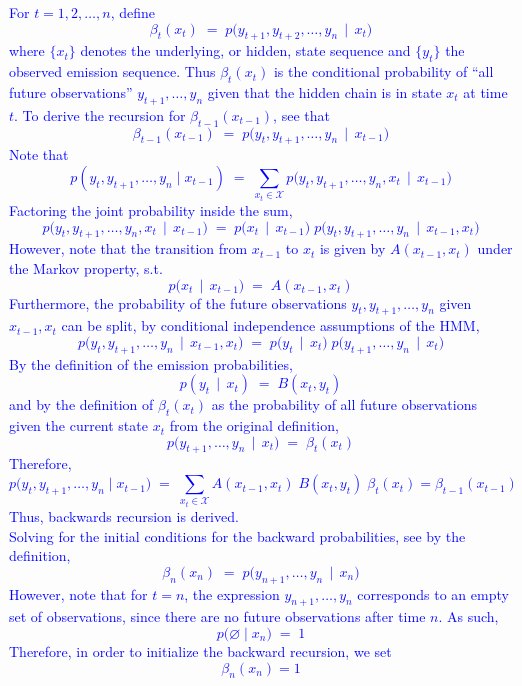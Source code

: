\documentclass{article}
\begin{document}
\textcolor{blue}{
For $t = 1, 2, \ldots, n$, define
\[
\beta_t(x_t) 
\;=\; 
p\bigl(y_{t+1}, y_{t+2}, \dots, y_n \,\mid\, x_t\bigr)
\]
where $\{x_t\}$ denotes the underlying, or hidden, state sequence and $\{y_t\}$ the observed emission sequence. 
Thus $\beta_t(x_t)$ is the conditional probability of ``all future observations'' $y_{t+1},\dots,y_n$ given that the hidden chain is in state $x_t$ at time $t$.
\noindent
To derive the recursion for $\beta_{t-1}(x_{t-1})$, see that
\[
\beta_{t-1}(x_{t-1}) 
\;=\; 
p\bigl(y_t, y_{t+1}, \dots, y_n \,\mid\, x_{t-1}\bigr)
\]
Note that
\[
p(y_t, y_{t+1}, \dots, y_n \mid x_{t-1})
\;=\;
\sum_{x_t \in \mathcal{X}}
p\bigl(y_t, y_{t+1}, \dots, y_n, x_t \,\mid\, x_{t-1}\bigr)
\]
Factoring the joint probability inside the sum,
\[
p\bigl(y_t, y_{t+1}, \dots, y_n, x_t \,\mid\, x_{t-1}\bigr)
\;=\;
p\bigl(x_t \,\mid\, x_{t-1}\bigr)\; p\bigl(y_t, y_{t+1}, \dots, y_n \,\mid\, x_{t-1}, x_t\bigr)
\]
However, note that the transition from $x_{t-1}$ to $x_t$ is given by $A(x_{t-1}, x_t)$ under the Markov property, s.t.
\[
p\bigl(x_t \,\mid\, x_{t-1}\bigr)
\;=\;
A(x_{t-1}, x_t)
\]
Furthermore, the probability of the future observations $y_t, y_{t+1}, \dots, y_n$ given $x_{t-1}, x_t$ can be split, by conditional independence assumptions of the HMM, 
\[
p\bigl(y_t, y_{t+1}, \dots, y_n \,\mid\, x_{t-1}, x_t \bigr)
\;=\;
p\bigl(y_t \,\mid\, x_t \bigr)\;p\bigl(y_{t+1}, \dots, y_n \,\mid\, x_t \bigr)
\]
By the definition of the emission probabilities,
\[
p(y_t \,\mid\, x_t)
\;=\;
B(x_t, y_t)
\]
and by the definition of $\beta_t(x_t)$ as the probability of all future observations given the current state $x_t$ from the original definition,
\[
p\bigl(y_{t+1}, \dots, y_n \,\mid\, x_t \bigr)
\;=\;
\beta_t(x_t)
\]
Therefore,
\[
p\bigl(y_t, y_{t+1}, \dots, y_n \mid x_{t-1}\bigr)
\;=\;
\sum_{x_t \in \mathcal{X}} 
A(x_{t-1}, x_t)\;
B(x_t, y_t)\;
\beta_t(x_t) = \beta_{t-1}(x_{t-1})
\]
Thus, backwards recursion is derived. \\ 
\noindent
Solving for the initial conditions for the backward probabilities, 
see by the definition, 
\[
\beta_n(x_n)
\;=\;
p\bigl(y_{n+1}, \dots, y_n \,\mid\, x_n\bigr)
\]
However, note that for $t=n$, the expression $y_{n+1}, \dots, y_n$ corresponds to an empty set of observations, since there are no future observations after time $n$. 
As such,
\[
p\bigl(\varnothing \mid x_n\bigr)
\;=\;
1
\]
Therefore, in order to initialize the backward recursion, we set
\[
\beta_n(x_n) = 1
\]
}

\bigskip
\end{document}
